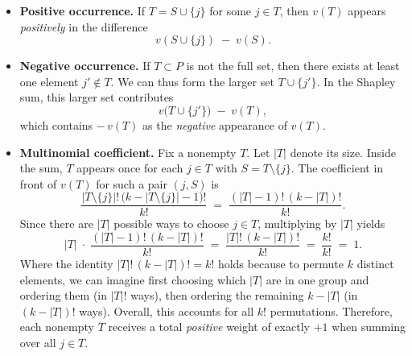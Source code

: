 \documentclass{article}
\begin{document}
\begin{proofsketch}
\begin{itemize}
    \item \textbf{Positive occurrence.} 
    If $T = S \cup \{j\}$ for some $j \in T$, then $v(T)$ appears \emph{positively} in the difference 
    \[
      v(S \cup \{j\}) \;-\; v(S).
    \]

    \item \textbf{Negative occurrence.} 
    If \(T \subset P\) is not the full set, then there exists at least one element \(j' \notin T\). We can thus form the larger set \(T \cup \{j'\}\). In the Shapley sum, this larger set contributes
    \[
      v\bigl(T \cup \{j'\}\bigr) \;-\; v(T),
    \]
    which contains \(-\,v(T)\) as the \emph{negative} appearance of \(v(T)\).

    \item \textbf{Multinomial coefficient.} 
    Fix a nonempty $T$. Let $|T|$ denote its size. Inside the sum, $T$ appears once for each $j \in T$ with $S = T \setminus \{j\}$. The coefficient in front of $v(T)$ for such a pair $(j,S)$ is
    \[
      \frac{|T\setminus\{j\}|!\,\bigl(k - |T\setminus\{j\}| -1\bigr)!}{k!}
      \;=\;
      \frac{(|T|-1)!\,(k - |T|)!}{k!}.
    \]
    Since there are $|T|$ possible ways to choose $j\in T$, multiplying by $|T|$ yields
    \[
      |T| 
      \;\cdot\; 
      \frac{(|T|-1)!\,(k - |T|)!}{k!}
      \;=\;
      \frac{|T|!\,(k - |T|)!}{k!}
      \;=\;
      \frac{k!}{k!}
      \;=\;
      1.
    \]
    Where the identity $|T|!\,(k - |T|)! = k!$ holds because to permute $k$ distinct elements, 
we can imagine first choosing which $|T|$ are in one group and ordering them 
(in $|T|!$ ways), then ordering the remaining $k - |T|$ (in $(k - |T|)!$ ways). 
Overall, this accounts for all $k!$ permutations. 
    Therefore, each nonempty $T$ receives a total \emph{positive} weight of exactly $+1$ when summing over all $j \in T$.


\end{itemize}
\end{proofsketch}
\end{document}
